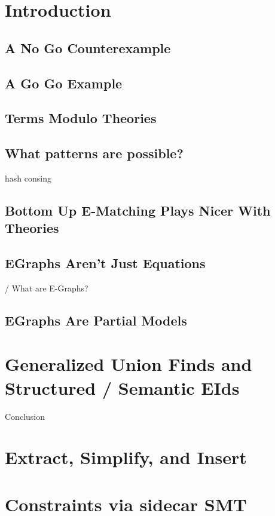 

\section{Introduction}
    \subsection{A No Go Counterexample}
    \subsection{A Go Go Example}

\subsection{Terms Modulo Theories}
    \subsection{What patterns are possible?}
    hash consing

\subsection {Bottom Up E-Matching Plays Nicer With Theories}

\subsection{EGraphs Aren't Just Equations}  / What are E-Graphs?

\subsection{EGraphs Are Partial Models}

\section {Generalized Union Finds and Structured / Semantic EIds}

Conclusion 
    \section{Extract, Simplify, and Insert}

    \section{Constraints via sidecar SMT}

